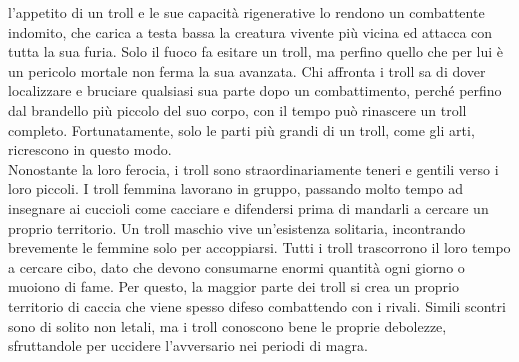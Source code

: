 \begin{multicols}{2}
l'appetito di un troll e le sue capacità rigenerative lo rendono un combattente indomito, che carica a testa bassa la creatura vivente più vicina ed attacca con tutta la sua furia. Solo il fuoco fa esitare un troll, ma perfino quello che per lui è un pericolo mortale non ferma la sua avanzata. Chi affronta i troll sa di dover localizzare e bruciare qualsiasi sua parte dopo un combattimento, perché perfino dal brandello più piccolo del suo corpo, con il tempo può rinascere un troll completo. Fortunatamente, solo le parti più grandi di un troll, come gli arti, ricrescono in questo modo.\\

Nonostante la loro ferocia, i troll sono straordinariamente teneri e gentili verso i loro piccoli. I troll femmina lavorano in gruppo, passando molto tempo ad insegnare ai cuccioli come cacciare e difendersi prima di mandarli a cercare un proprio territorio. Un troll maschio vive un’esistenza solitaria, incontrando brevemente le femmine solo per accoppiarsi. Tutti i troll trascorrono il loro tempo a cercare cibo, dato che devono consumarne enormi quantità ogni giorno o muoiono di fame. Per questo, la maggior parte dei troll si crea un proprio territorio di caccia che viene spesso difeso combattendo con i rivali. Simili scontri sono di solito non letali, ma i troll conoscono bene le proprie debolezze, sfruttandole per uccidere l'avversario nei periodi di magra.\\


\end{multicols}
